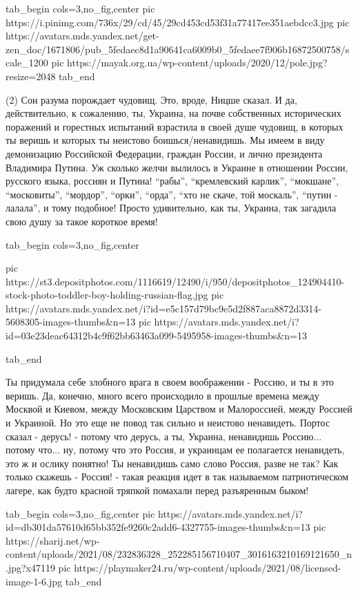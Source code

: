 \ifcmt
  tab_begin cols=3,no_fig,center
     pic https://i.pinimg.com/736x/29/cd/45/29cd453cd53f31a77417ee351aebdcc3.jpg
     pic https://avatars.mds.yandex.net/get-zen_doc/1671806/pub_5fedaec8d1a90641ca6009b0_5fedaee7f906b16872500758/scale_1200
     pic https://mayak.org.ua/wp-content/uploads/2020/12/pole.jpg?resize=2048%
  tab_end
\fi

(2) Сон разума порождает чудовищ. Это, вроде, Ницше сказал. И да,
действительно, к сожалению, ты, Украина, на почве собственных исторических
поражений и горестных испытаний взрастила в своей душе чудовищ, в которых ты
веришь и которых ты неистово боишься/ненавидишь. Мы имеем в виду демонизацию Российской Федерации,
граждан России, и лично президента Владимира Путина. Уж сколько желчи вылилось
в Украине в отношении России, русского языка, россиян и Путина! \enquote{рабы},
\enquote{кремлевский карлик}, \enquote{мокшане}, \enquote{московиты},
\enquote{мордор}, \enquote{орки}, \enquote{орда}, \enquote{хто не скаче, той
москаль}, \enquote{путин - лалала}, и тому подобное! Просто удивительно, как
ты, Украина, так загадила свою душу за такое короткое время!

\ifcmt
  tab_begin cols=3,no_fig,center

     pic https://st3.depositphotos.com/1116619/12490/i/950/depositphotos_124904410-stock-photo-toddler-boy-holding-russian-flag.jpg
     pic https://avatars.mds.yandex.net/i?id=e5c157d79bc9e5d2f887aca8872d3314-5608305-images-thumbs&n=13
     pic https://avatars.mds.yandex.net/i?id=03e23deac64312b4c9f62bb63463a099-5495958-images-thumbs&n=13

  tab_end
\fi

Ты придумала себе злобного врага в своем
воображении - Россию, и ты в это веришь. Да, конечно, много всего происходило в
прошлые времена между Москвой и Киевом, между Московским Царством и
Малороссией, между Россией и Украиной.  Но это еще не повод так сильно и
неистово ненавидеть. Портос сказал - дерусь! - потому что дерусь, а ты,
Украина, ненавидишь Россию... потому что... ну, потому что это Россия, и
украинцам ее полагается ненавидеть, это ж и ослику понятно! Ты ненавидишь само
слово Россия, разве не так? Как только скажешь - Россия! - такая реакция идет в
так называемом патриотическом лагере, как будто красной тряпкой помахали перед
разъяренным быком! 

\ifcmt
  tab_begin cols=3,no_fig,center
     pic https://avatars.mds.yandex.net/i?id=db301da57610d65bb352fe9260c2add6-4327755-images-thumbs&n=13
     pic https://sharij.net/wp-content/uploads/2021/08/232836328_252285156710407_3016163210169121650_n.jpg?x47119
     pic https://playmaker24.ru/wp-content/uploads/2021/08/licensed-image-1-6.jpg
  tab_end
\fi

